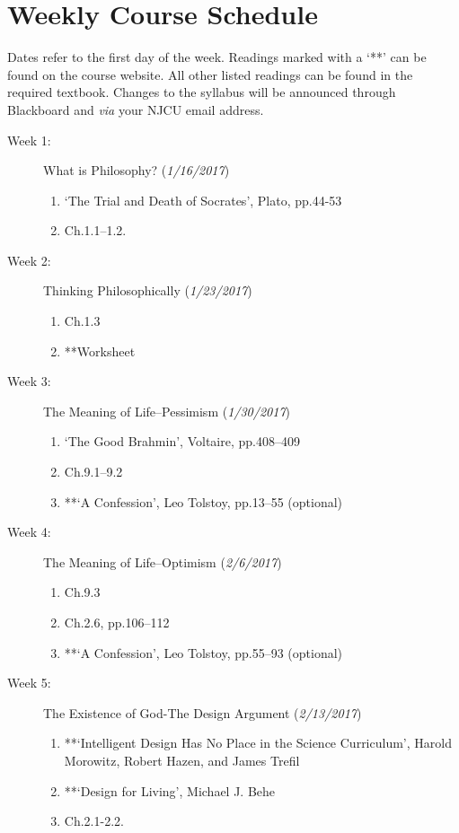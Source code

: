 \documentclass[article,oneside]{memoir}
\begin{document}
\section{Weekly Course Schedule}
Dates refer to the first day of the week. Readings marked with a `**' can be found on the course website. All other listed readings can be found in the required textbook. Changes to the syllabus will be announced through Blackboard and \emph{via} your NJCU email address. \newline





\begin{description}




\item[Week 1: ] What is Philosophy? (\emph{1/16/2017})
\begin{enumerate}
\item `The Trial and Death of Socrates', Plato, pp.44-53
\item Ch.1.1--1.2.
\end{enumerate}

\item[Week 2:]  Thinking Philosophically (\emph{1/23/2017})
\begin{enumerate}
\item Ch.1.3
\item **Worksheet
\end{enumerate}

\item[Week 3:]  The Meaning of Life--Pessimism (\emph{1/30/2017})
\begin{enumerate}
\item `The Good Brahmin', Voltaire, pp.408--409
\item Ch.9.1--9.2 
\item **`A Confession', Leo Tolstoy, pp.13--55 (optional)
\end{enumerate}

\item[Week 4: ] The Meaning of Life--Optimism (\emph{2/6/2017})
\begin{enumerate}
\item Ch.9.3
\item Ch.2.6, pp.106--112
\item **`A Confession', Leo Tolstoy, pp.55--93 (optional)
\end{enumerate}

\item[Week 5: ] The Existence of God-The Design Argument (\emph{2/13/2017})
\begin{enumerate}
\item **`Intelligent Design Has No Place in the Science Curriculum', Harold Morowitz, Robert Hazen, and James Trefil
 \item **`Design for Living', Michael J. Behe
\item Ch.2.1-2.2. 
 \end{enumerate}
 

\end{description}
\end{document}
